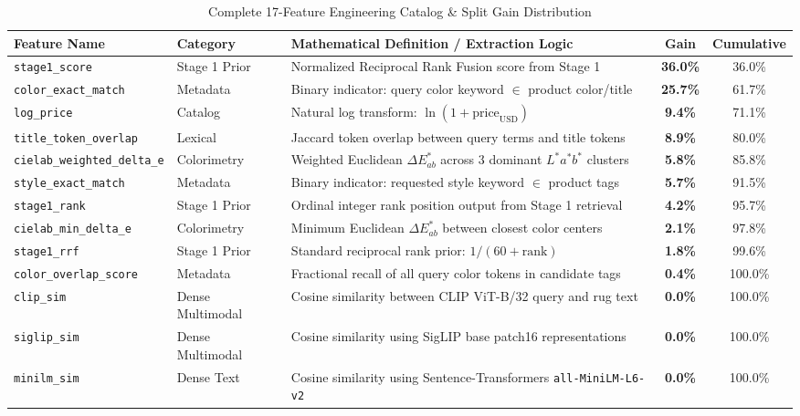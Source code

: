 \documentclass[11pt,a4paper]{article}
\begin{document}
\begin{table}[htbp]
\centering
\small
\caption{Complete 17-Feature Engineering Catalog \& Split Gain Distribution}
\label{tab:feature_catalog}
\begin{tabularx}{\textwidth}{lp{2.8cm}Xcc}
\toprule
\textbf{Feature Name} & \textbf{Category} & \textbf{Mathematical Definition / Extraction Logic} & \textbf{Gain} & \textbf{Cumulative} \\
\midrule
\texttt{stage1\_score} & Stage 1 Prior & Normalized Reciprocal Rank Fusion score from Stage 1 & \textbf{36.0\%} & 36.0\% \\
\texttt{color\_exact\_match} & Metadata & Binary indicator: query color keyword $\in$ product color/title & \textbf{25.7\%} & 61.7\% \\
\texttt{log\_price} & Catalog & Natural log transform: $\ln(1 + \text{price}_{\text{USD}})$ & \textbf{9.4\%} & 71.1\% \\
\texttt{title\_token\_overlap} & Lexical & Jaccard token overlap between query terms and title tokens & \textbf{8.9\%} & 80.0\% \\
\texttt{cielab\_weighted\_delta\_e} & Colorimetry & Weighted Euclidean $\Delta E^*_{ab}$ across 3 dominant $L^*a^*b^*$ clusters & \textbf{5.8\%} & 85.8\% \\
\texttt{style\_exact\_match} & Metadata & Binary indicator: requested style keyword $\in$ product tags & \textbf{5.7\%} & 91.5\% \\
\texttt{stage1\_rank} & Stage 1 Prior & Ordinal integer rank position output from Stage 1 retrieval & \textbf{4.2\%} & 95.7\% \\
\texttt{cielab\_min\_delta\_e} & Colorimetry & Minimum Euclidean $\Delta E^*_{ab}$ between closest color centers & \textbf{2.1\%} & 97.8\% \\
\texttt{stage1\_rrf} & Stage 1 Prior & Standard reciprocal rank prior: $1 / (60 + \text{rank})$ & \textbf{1.8\%} & 99.6\% \\
\texttt{color\_overlap\_score} & Metadata & Fractional recall of all query color tokens in candidate tags & \textbf{0.4\%} & 100.0\% \\
\texttt{clip\_sim} & Dense Multimodal & Cosine similarity between CLIP ViT-B/32 query and rug text & \textbf{0.0\%} & 100.0\% \\
\texttt{siglip\_sim} & Dense Multimodal & Cosine similarity using SigLIP base patch16 representations & \textbf{0.0\%} & 100.0\% \\
\texttt{minilm\_sim} & Dense Text & Cosine similarity using Sentence-Transformers \texttt{all-MiniLM-L6-v2} & \textbf{0.0\%} & 100.0\% \\

\end{tabularx}
\end{table}
\end{document}
